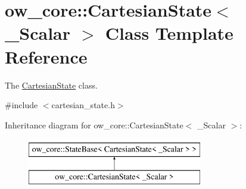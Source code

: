 \hypertarget{classow__core_1_1CartesianState}{}\section{ow\+\_\+core\+:\+:Cartesian\+State$<$ \+\_\+\+Scalar $>$ Class Template Reference}
\label{classow__core_1_1CartesianState}


The \hyperlink{classow__core_1_1CartesianState}{Cartesian\+State} class.  




{\ttfamily \#include $<$cartesian\+\_\+state.\+h$>$}

Inheritance diagram for ow\+\_\+core\+:\+:Cartesian\+State$<$ \+\_\+\+Scalar $>$\+:\begin{figure}[H]
\begin{center}
\leavevmode
\includegraphics[height=2.000000cm]{d3/de2/classow__core_1_1CartesianState}
\end{center}
\end{figure}
